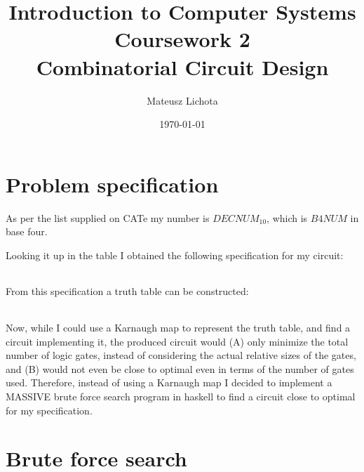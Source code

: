 \documentclass[12pt]{article}
\begin{document}
\title{\large \textbf{Introduction to Computer Systems Coursework 2 \\ 
\vspace{0.5em}
\large Combinatorial Circuit Design}}


\author{Mateusz Lichota}
\date{\today}
\maketitle

\section {Problem specification}
As per the list supplied on CATe my number is $DECNUM_{10}$, which is $B4NUM$ in base four.

Looking it up in the table I obtained the following specification for my circuit:

\begin{table}[h]
  \centering
  \begin{tabular}{|c|c|c|c|}
  \hline  
  

  \end{tabular}
\end{table}

From this specification a truth table can be constructed:

\begin{table}[h]
  \centering
\begin{tabular}{|c|c|c|c|c|c|}
  \hline




  \hline
\end{tabular}
\end{table}

Now, while I could use a Karnaugh map to represent the truth table, and find a circuit implementing it,
the produced circuit would (A) only minimize the total number of logic gates, instead of considering
the actual relative sizes of the gates, and (B) would not even be close to optimal even in terms of the
number of gates used. Therefore, instead of using a Karnaugh map I decided to implement a MASSIVE brute
force search program in haskell to find a circuit close to optimal for my specification.

\section {Brute force search}
\end{document}
